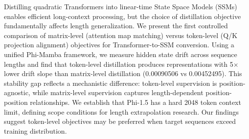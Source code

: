 Distilling quadratic Transformers into linear-time State Space Models (SSMs) enables efficient long-context processing, but the choice of distillation objective fundamentally affects length generalization. We present the first controlled comparison of matrix-level (attention map matching) versus token-level (Q/K projection alignment) objectives for Transformer-to-SSM conversion. Using a unified Phi-Mamba framework, we measure hidden state drift across sequence lengths and find that token-level distillation produces representations with 5$\times$ lower drift slope than matrix-level distillation (0.00090506 vs 0.00452495). This stability gap reflects a mechanistic difference: token-level supervision is position-agnostic, while matrix-level supervision captures length-dependent position-position relationships. We establish that Phi-1.5 has a hard 2048 token context limit, defining scope conditions for length extrapolation research. Our findings suggest token-level objectives may be preferred when target sequences exceed training distribution.
